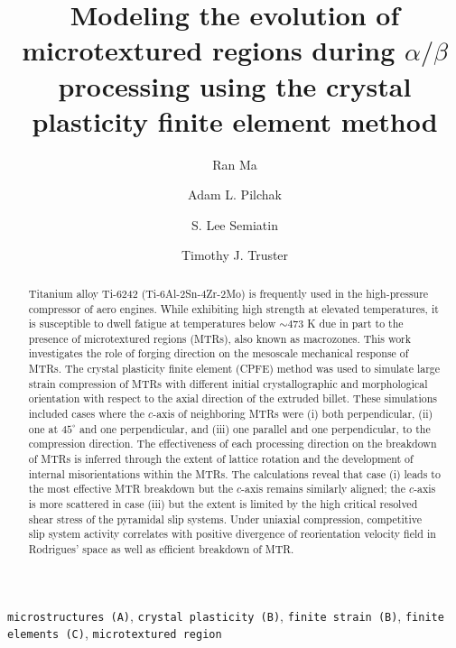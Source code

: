 \documentclass[review]{elsarticle}
\begin{document}
\begin{frontmatter}

\title{Modeling the evolution of microtextured regions during $\alpha/\beta$ processing using the crystal plasticity finite element method}
%
%
\author[UTK]{Ran Ma}
\author[AFL]{Adam L. Pilchak}
\author[AFL]{S. Lee Semiatin}
\author[UTK]{Timothy J. Truster}
\address[UTK]{Department of Civil and Environmental Engineering, University of Tennessee, Knoxville TN 37996, United States}
\address[AFL]{Air Force Research Laboratory, Materials and Manufacturing Directorate, AFRL/RXCM, Wright-Patterson AFB, OH 45433, United States}
%
%
\begin{abstract}
Titanium alloy Ti-6242 (Ti-6Al-2Sn-4Zr-2Mo) is frequently used in the high-pressure compressor of aero engines.
While exhibiting high strength at elevated temperatures, it is susceptible to dwell fatigue at temperatures below $\sim 473$ K due in part to the presence of microtextured regions (MTRs), also known as macrozones.
This work investigates the role of forging direction on the mesoscale mechanical response of MTRs.
The crystal plasticity finite element (CPFE) method was used to simulate large strain compression of MTRs with different initial crystallographic and morphological orientation with respect to the axial direction of the extruded billet.
These simulations included cases where the $c$-axis of neighboring MTRs were (i) both perpendicular, (ii) one at $45^{\circ}$ and one perpendicular, and (iii) one parallel and one perpendicular, to the compression direction.
The effectiveness of each processing direction on the breakdown of MTRs is inferred through the extent of lattice rotation and the development of internal misorientations within the MTRs.
The calculations reveal that case (i) leads to the most effective MTR breakdown but the $c$-axis remains similarly aligned; the $c$-axis is more scattered in case (iii) but the extent is limited by the high critical resolved shear stress of the pyramidal slip systems.
Under uniaxial compression, competitive slip system activity correlates with positive divergence of reorientation velocity field in Rodrigues' space as well as efficient breakdown of MTR.
\end{abstract}

\begin{keyword}
\texttt{microstructures (A)}\sep 
\texttt{crystal plasticity (B)}\sep 
\texttt{finite strain (B)}\sep 
\texttt{finite elements (C)}\sep 
\texttt{microtextured region}
\end{keyword}

\end{frontmatter}
\end{document}
